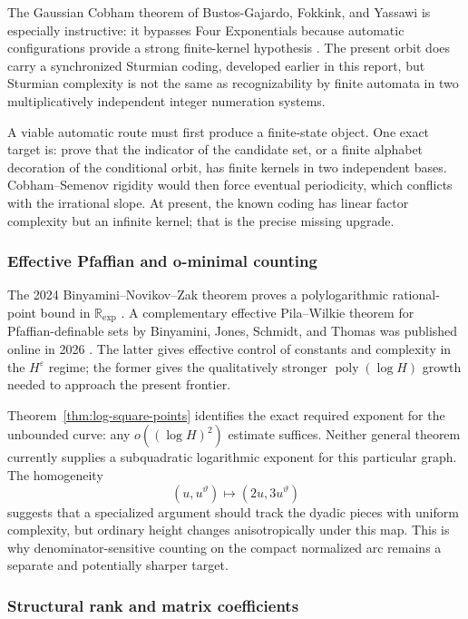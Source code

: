 \documentclass[11pt,oneside]{article}
\theoremstyle{definition}
\theoremstyle{remark}
\newcommand{\R}{\mathbb R}
\newcommand{\thetaq}{\vartheta}
\begin{document}
The Gaussian Cobham theorem of Bustos-Gajardo, Fokkink, and Yassawi is especially instructive:
it bypasses Four Exponentials because automatic configurations provide a strong finite-kernel
hypothesis \cite{BustosFokkinkYassawi2026}.  The present orbit does carry a synchronized
Sturmian coding, developed earlier in this report, but Sturmian complexity is not the same as
recognizability by finite automata in two multiplicatively independent integer numeration
systems.

A viable automatic route must first produce a finite-state object.  One exact target is:
prove that the indicator of the candidate set, or a finite alphabet decoration of the
conditional orbit, has finite kernels in two independent bases.  Cobham--Semenov rigidity
would then force eventual periodicity, which conflicts with the irrational slope.  At
present, the known coding has linear factor complexity but an infinite kernel; that is the
precise missing upgrade.

\subsubsection{Effective Pfaffian and o-minimal counting}

The 2024 Binyamini--Novikov--Zak theorem proves a polylogarithmic rational-point bound in
$\R_{\exp}$ \cite{BinyaminiNovikovZak2024}.  A complementary effective Pila--Wilkie theorem
for Pfaffian-definable sets by Binyamini, Jones, Schmidt, and Thomas was published online in
2026 \cite{BinyaminiJonesSchmidtThomas2026}.  The latter gives effective control of constants
and complexity in the $H^\varepsilon$ regime; the former gives the qualitatively stronger
$\operatorname{poly}(\log H)$ growth needed to approach the present frontier.

Theorem~\ref{thm:log-square-points} identifies the exact required exponent for the unbounded
curve: any $o((\log H)^2)$ estimate suffices.  Neither general theorem currently supplies a
subquadratic logarithmic exponent for this particular graph.  The homogeneity
\[
  (u,u^{\thetaq})\longmapsto(2u,3u^{\thetaq})
\]
suggests that a specialized argument should track the dyadic pieces with uniform complexity,
but ordinary height changes anisotropically under this map.  This is why denominator-sensitive
counting on the compact normalized arc remains a separate and potentially sharper target.

\subsubsection{Structural rank and matrix coefficients}
\end{document}
